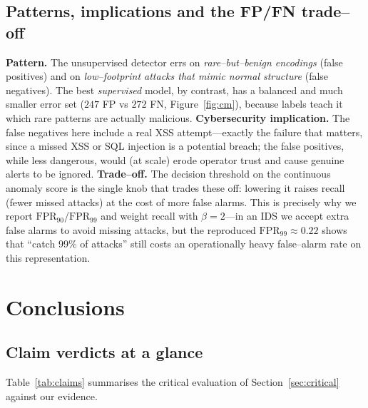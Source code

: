 \documentclass[11pt,a4paper]{article}
\begin{document}
\subsection{Patterns, implications and the FP/FN trade--off}
\textbf{Pattern.} The unsupervised detector errs on \emph{rare--but--benign encodings}
(false positives) and on \emph{low--footprint attacks that mimic normal structure} (false
negatives). The best \emph{supervised} model, by contrast, has a balanced and much smaller
error set ($247$ FP vs $272$ FN, Figure~\ref{fig:cm}), because labels teach it which rare
patterns are actually malicious. \textbf{Cybersecurity implication.} The false negatives
here include a real XSS attempt---exactly the failure that matters, since a missed XSS or
SQL injection is a potential breach; the false positives, while less dangerous, would (at
scale) erode operator trust and cause genuine alerts to be ignored. \textbf{Trade--off.}
The decision threshold on the continuous anomaly score is the single knob that trades
these off: lowering it raises recall (fewer missed attacks) at the cost of more false
alarms. This is precisely why we report $\text{FPR}_{90}$/$\text{FPR}_{99}$ and weight
recall with $\beta=2$---in an IDS we accept extra false alarms to avoid missing attacks,
but the reproduced $\text{FPR}_{99}\approx0.22$ shows that ``catch 99\% of attacks'' still
costs an operationally heavy false--alarm rate on this representation.

\section{Conclusions}
\label{sec:conclusions}

\subsection{Claim verdicts at a glance}
Table~\ref{tab:claims} summarises the critical evaluation of Section~\ref{sec:critical}
against our evidence.
\end{document}

